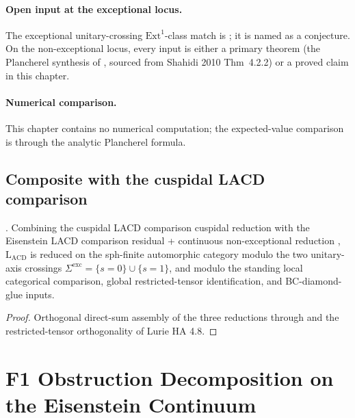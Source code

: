 \paragraph{Open input at the exceptional locus.}
The exceptional unitary-crossing \(\mathrm{Ext}^1\)-class match is
; it is named
as a conjecture. On the non-exceptional locus, every input is
either a primary theorem (the Plancherel synthesis of
, sourced from Shahidi 2010
Thm~4.2.2) or a proved claim in this chapter.

\paragraph{Numerical comparison.}
This chapter contains no numerical computation; the expected-value
comparison is through the analytic Plancherel formula.

\subsection{Composite with the cuspidal LACD comparison}

\begin{theorem}
\label{v4-arith:w6-d:thm:composite-LACD}
\ClaimStatusProvedHereConditional. Combining the cuspidal LACD comparison cuspidal reduction
 with the Eisenstein LACD comparison residual +
continuous non-exceptional reduction
,
\(\mathrm{L}_{\mathrm{ACD}}\) is reduced on the sph-finite automorphic
category modulo the two unitary-axis crossings
\(\Sigma^{\mathrm{exc}}=\{s=0\}\cup\{s=1\}\), and modulo the standing
local categorical comparison, global restricted-tensor identification,
and BC-diamond-glue inputs.
\end{theorem}

\begin{proof}
Orthogonal direct-sum assembly of the three reductions through
 and the restricted-tensor
orthogonality of Lurie HA 4.8.
\end{proof}

\section{F1 Obstruction Decomposition on the Eisenstein Continuum}
\label{v4-arith:w6-d:residual-table}

